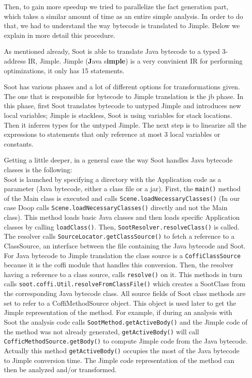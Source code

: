 \documentclass{dithesis}
\begin{document}
    	Then, to gain more speedup we tried to parallelize the fact generation part, which takes a similar amount of time as an entire simple analysis. In order to do that, we had to understand the way bytecode is translated to Jimple. Below we explain in more detail this procedure.

        As mentioned already, Soot is able to translate Java bytecode to a typed 3-address IR, Jimple. Jimple (\textbf{J}ava s\textbf{imple}) is a very convinient IR for performing optimizations, it only has 15 statements.

        Soot has various phases and a lot of different options for transformations given. The one that is responsible for bytecode to Jimple translation is the jb phase. In this phase, first Soot translates bytecode to untyped Jimple and introduces new local variables; Jimple is stackless, Soot is using variables for stack locations. Then it inferres types for the untyped Jimple. The next step is to linearize all the expressions to statements that only reference at most 3 local variables or constants.

        Getting a little deeper, in a general case the way Soot handles Java bytecode classes is the following: \\
        Soot is launched by specifying a directory with the Application code as a parameter (Java bytecode, either a class file or a jar). First, the \texttt{main()} method of the Main class is executed and calls \texttt{Scene.loadNecessaryClasses()} (In our case Doop calls \texttt{Scene.loadNecessaryClasses()} directly and not the Main class). This method loads basic Java classes and then loads specific Application classes by calling \texttt{loadClass()}. Then, \texttt{SootResolver.resolveClass()} is called. The resolver calls \texttt{SourceLocator.getClassSource()} to fetch a reference to a ClassSource, an interface between the file containing the Java bytecode and Soot. For Java bytecode to Jimple translation the class source is a \texttt{CoffiClassSource} because it is the coffi module that handles this conversion. Then, the resolver having a reference to a class source, calls \texttt{resolve()} on it. This methods in turn calls \texttt{soot.coffi.Util.resolveFromClassFile()} which creates a SootClass from the corresponding Java bytecode class. All source fields of Soot class methods are set to refer to a CoffiMethodSource object. This object is used later to get the Jimple representation of the method. For example, if during an analysis with Soot the analysis code calls \texttt{SootMethod.getActiveBody()} and the Jimple code of the method was not already generated, \texttt{getActiveBody()} will call \texttt{CofficMethodSource.getBody()} to compute Jimple code from the Java bytecode. Actually this method \texttt{getActiveBody()} occupies the most of the Java bytecode to Jimple conversion time. The Jimple code representation of the method can then be analyzed and/or transformed.
\end{document}
